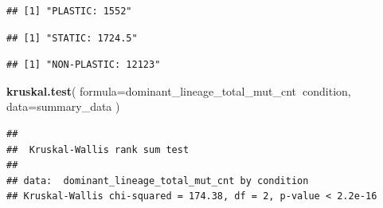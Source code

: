 \documentclass[]{book}
\newenvironment{Shaded}{\begin{snugshade}}{\end{snugshade}}
\newcommand{\DataTypeTok}[1]{\textcolor[rgb]{0.13,0.29,0.53}{#1}}
\newcommand{\KeywordTok}[1]{\textcolor[rgb]{0.13,0.29,0.53}{\textbf{#1}}}
\newcommand{\NormalTok}[1]{#1}
\newcommand{\OperatorTok}[1]{\textcolor[rgb]{0.81,0.36,0.00}{\textbf{#1}}}
\newcommand{\StringTok}[1]{\textcolor[rgb]{0.31,0.60,0.02}{#1}}
\begin{document}
\begin{verbatim}
## [1] "PLASTIC: 1552"
\end{verbatim}

\begin{Shaded}
\end{Shaded}

\begin{verbatim}
## [1] "STATIC: 1724.5"
\end{verbatim}

\begin{Shaded}
\end{Shaded}

\begin{verbatim}
## [1] "NON-PLASTIC: 12123"
\end{verbatim}

\begin{Shaded}
\begin{Highlighting}[]
\KeywordTok{kruskal.test}\NormalTok{(}
  \DataTypeTok{formula=}\NormalTok{dominant_lineage_total_mut_cnt}\OperatorTok{~}\NormalTok{condition,}
  \DataTypeTok{data=}\NormalTok{summary_data}
\NormalTok{)}
\end{Highlighting}
\end{Shaded}

\begin{verbatim}
## 
##  Kruskal-Wallis rank sum test
## 
## data:  dominant_lineage_total_mut_cnt by condition
## Kruskal-Wallis chi-squared = 174.38, df = 2, p-value < 2.2e-16
\end{verbatim}

\begin{Shaded}
\end{Shaded}
\end{document}
